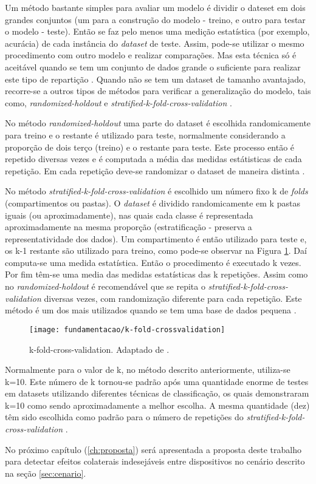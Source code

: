 Um método bastante simples para avaliar um modelo é dividir o dateset em dois grandes conjuntos (um para a construção do modelo - treino, e outro para testar o modelo - teste). Então se faz pelo menos uma medição estatística (por exemplo, acurácia) de cada instância do \textit{dataset} de teste. Assim, pode-se utilizar o mesmo procedimento com outro modelo e realizar comparações. Mas esta técnica só é aceitável quando se tem um conjunto de dados grande o suficiente para realizar este tipo de repartição \cite{Kotsiantis:2007}. Quando não se tem um dataset de tamanho avantajado, recorre-se a outros tipos de métodos para verificar a generalização do modelo, tais como, \textit{randomized-holdout} e \textit{stratified-k-fold-cross-validation} \cite{Witten:2005}.

No método \textit{randomized-holdout} uma parte do dataset é escolhida randomicamente para treino e o restante é utilizado para teste, normalmente considerando a proporção de dois terço (treino) e o restante para teste. Este processo então é repetido diversas vezes e é computada a média das medidas estátisticas de cada repetição. Em cada repetição deve-se randomizar o dataset de maneira distinta \cite{Witten:2005}.

No método \textit{stratified-k-fold-cross-validation} é escolhido um número fixo k de \textit{folds} (compartimentos ou pastas). O \textit{dataset} é dividido randomicamente em k pastas iguais (ou aproximadamente), nas quais cada classe é representada aproximadamente na mesma proporção (estratificação - preserva a representatividade dos dados). 
Um compartimento é então utilizado para teste e, os k-1 restante são utilizado para treino, como pode-se observar na Figura \ref{fig:kfoldcrossvalidation}. Daí computa-se uma medida estatística. Então o procedimento é executado k vezes. Por fim têm-se uma media das medidas estatísticas das k repetições. Assim como no \textit{randomized-holdout} é recomendável que se repita o \textit{stratified-k-fold-cross-validation} diversas vezes, com randomização diferente para cada repetição. Este método é um dos mais utilizados quando se tem uma base de dados pequena \cite{Witten:2005}.

\begin{figure}[!htb] \centering 
  \centering
  \texttt{[image: fundamentacao/k-fold-crossvalidation]} 
  \caption{k-fold-cross-validation. Adaptado de \cite{Olson:2008}.} 
  \label{fig:kfoldcrossvalidation}
\end{figure}

Normalmente para o valor de k, no método descrito anteriormente, utiliza-se k=10. Este número de k tornou-se padrão após uma quantidade enorme de testes em datasets utilizando diferentes técnicas de classificação, os quais demonstraram k=10 como sendo aproximadamente a melhor escolha. A mesma quantidade (dez) têm sido escolhida como padrão para o número de repetições do \textit{stratified-k-fold-cross-validation} \cite{Witten:2005}.

No próximo capítulo (\ref{ch:proposta}) será apresentada a proposta deste trabalho para detectar efeitos colaterais indesejáveis entre dispositivos no cenário descrito na seção \ref{sec:cenario}.
